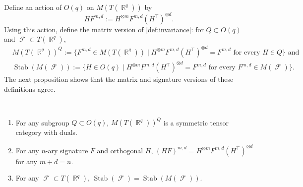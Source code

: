 \documentclass{theoretics}
\DeclareMathOperator{\rr}{\mathbb{R}}
\DeclareMathOperator{\fc}{\mathcal{F}}
\DeclareMathOperator{\stab}{Stab}
\begin{document}
Define an action of $O(q)$ on $M(T(\rr^q))$ by 
\[
    HF^{m,d} := H^{\otimes m} F^{m,d} (H^\top)^{\otimes d}.
\]
Using this action, define the matrix version of \autoref{def:invariance}: for $Q \subset O(q)$ and
$\fc \subset T(\rr^q)$,
\begin{align*}
    &M(T(\rr^q))^Q := \{F^{m,d} \in M(T(\rr^q)) \mid H^{\otimes m} F^{m,d} (H^\top)^{\otimes d} = F^{m,d} \text{ for every } H \in Q\} \text{ and}\\
    &\stab(M(\fc)) := \{H \in O(q) \mid H^{\otimes m}F^{m,d} (H^\top)^{\otimes d} = F^{m,d} \text{ for every } F^{m,d} \in M(\fc)\}. 
\end{align*}
The next proposition shows that the matrix and signature versions of these definitions agree.
\begin{proposition}
    \label{prop:invariant_tcwd}
    ~
    \begin{enumerate}
        \item For any subgroup $Q \subset O(q)$, $M(T(\rr^q))^Q$ is a symmetric tensor category with duals.
        \item For any $n$-ary signature $F$ and orthogonal $H$,
            $(HF)^{m,d} = H^{\otimes m} F^{m,d} (H^\top)^{\otimes d}$ for any $m + d = n$.
        \item For any $\fc \subset T(\rr^q)$, $\stab(\fc) = \stab(M(\fc))$. 
    \end{enumerate}
\end{proposition}
\end{document}
